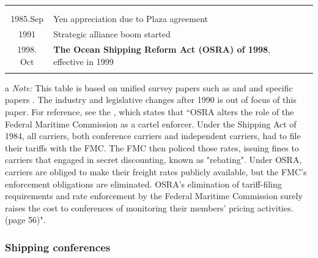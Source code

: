 \documentclass[11pt]{article}
\begin{document}
\begin{table}[ht!]
\begin{tabular}{cll}
      & &\cite{wilson1991some}\\
      & &\cite{pirrong1992application}\\
      1985.Sep&Yen appreciation due to Plaza agreement&\\\hline
      1991 & Strategic alliance boom started &\\
      1998. Oct  & \textbf{The Ocean Shipping Reform Act (OSRA) of 1998}, effective in 1999 &\cite{reitzes2002rolling}\\
      &&\cite{fusillo2006some,fusillo2013stability}\\\hline
    \end{tabular}
    \begin{tablenotes}
\item[a]\textit{Note:} This table is based on unified survey papers such as \cite{sjostrom2004ocean,sjostrom2013competition} and \cite{martin2012market} and specific papers \citep{clyde1995effectiveness,clyde1998market}. The industry and legislative changes after 1990 is out of focus of this paper. For reference, see the \cite{reitzes2002rolling}, which states that ``OSRA alters the role of the Federal Maritime Commission as a cartel enforcer. Under the Shipping Act of 1984, all carriers, both conference carriers and independent carriers, had to file their tariffs with the FMC. The FMC then policed those rates, issuing fines to carriers that engaged in secret discounting, known as "rebating". Under OSRA, carriers are obliged to make their freight rates publicly available, but the FMC's enforcement obligations are eliminated. OSRA's elimination of tariff-filing requirements and rate enforcement by the Federal Maritime Commission surely raises the cost to conferences of monitoring their members' pricing activities. (page 56)".
   \end{tablenotes}
\end{table}

\subsubsection{Shipping conferences}\label{subsec:shipping_conference}
\end{document}
